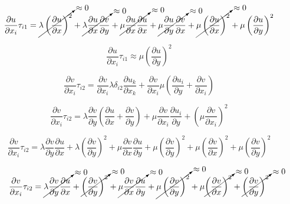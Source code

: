 \begin{equation} 
\frac{\partial u}{\partial x_i}\tau_{i1}=
\cancelto{\approx0}{
\lambda 
\left(\frac{\partial u}{\partial x}\right)^2
}
+
\cancelto{\approx0}{
\lambda 
\frac{\partial u }{\partial x}
\frac{\partial v }{\partial y}
}
+
\cancelto{\approx0}{
\mu\frac{\partial u}{\partial x}
\frac{\partial u}{\partial x}
}
+
\cancelto{\approx0}{
\mu\frac{\partial u}{\partial y}
\frac{\partial v}{\partial x}
}
+
\cancelto{\approx0}{
\mu\left(\frac{\partial u}{\partial x}\right)^2
}
+
\mu\left(\frac{\partial u}{\partial y}\right)^2
\end{equation} 

\begin{equation} 
\frac{\partial u}{\partial x_i}\tau_{i1}\approx
\mu\left(\frac{\partial u}{\partial y}\right)^2
\end{equation} 

\begin{equation} 
\frac{\partial v}{\partial x_i}\tau_{i2}=
\frac{\partial v}{\partial x_i}\lambda \delta_{i2}\frac{\partial u_k}{\partial x_k}+
\frac{\partial v}{\partial x_i}\mu\left(\frac{\partial u_i}{\partial y}
+\frac{\partial v}{\partial x_i}\right)
\end{equation} 

\begin{equation} 
\frac{\partial v}{\partial x_i}\tau_{i2}=
\lambda\frac{\partial v}{\partial y}
\left(
\frac{\partial u}{\partial x}+
\frac{\partial v}{\partial y}
\right)
+\mu\frac{\partial v}{\partial x_i}
\frac{\partial u_i}{\partial y}+
\left(
\mu\frac{\partial v}{\partial x_i}\right)^2
\end{equation} 

\begin{equation} 
\frac{\partial v}{\partial x_i}\tau_{i2}=
\lambda\frac{\partial v}{\partial y}
\frac{\partial u}{\partial x}+
\lambda
\left(
\frac{\partial v}{\partial y}\right)^2+
\mu\frac{\partial v}{\partial x}
\frac{\partial u}{\partial y}+
\mu
\left(
\frac{\partial v}{\partial y}
\right)^2+
\mu
\left(
\frac{\partial v}{\partial x}
\right)^2+
\mu
\left(
\frac{\partial v}{\partial y}
\right)^2
\end{equation} 

\begin{equation} 
\frac{\partial v}{\partial x_i}\tau_{i2}=
\cancelto{\approx0}{
\lambda\frac{\partial v}{\partial y}
\frac{\partial u}{\partial x}
}
+
\cancelto{\approx0}{
\left(
\frac{\partial v}{\partial y}
\right)^2
}
+
\cancelto{\approx0}{
\mu\frac{\partial v}{\partial x}
\frac{\partial u}{\partial y}
}
+
\cancelto{\approx0}{
\mu
\left(
\frac{\partial v}{\partial y}
\right)^2
}
+
\mu
\cancelto{\approx0}{
\left(
\frac{\partial v}{\partial x}
\right)^2
}
+
\cancelto{\approx0}{
\left(
\frac{\partial v}{\partial y}
\right)^2
}
\end{equation} 

